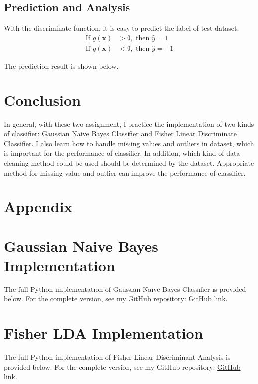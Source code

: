 \documentclass[a4paper,12pt]{article}
\begin{document}
\subsection{Prediction and Analysis}
With the discriminate function, it is easy to predict the label of test dataset.
\begin{equation}
\begin{aligned}
    \text{If } g(\mathbf{x}) &> 0, \text{ then } \hat{y} = 1\\
    \text{If } g(\mathbf{x}) &< 0, \text{ then } \hat{y} = -1
\end{aligned}
\end{equation}

The prediction result is shown below.

\section{Conclusion}
In general, with these two assignment, I practice the implementation of two kinds of classifier: Gaussian Naive Bayes Classifier and Fisher Linear Discriminate Classifier. I also learn how to handle missing values and outliers in dataset, which is important for the performance of classifier.
In addition, which kind of data cleaning method could be used should be determined by the dataset. Appropriate method for missing value and outlier can improve the performance of classifier.
\newpage



\newpage
\section{Appendix}
\appendix
\section{Gaussian Naive Bayes Implementation}
The full Python implementation of Gaussian Naive Bayes Classifier is provided below.
For the complete version, see my GitHub repository:
\href{https://github.com/yzmyyds/NTU_EE6407/blob/main/Assignments/Assignment_1/Implement.ipynb}{GitHub link}.
\section{Fisher LDA Implementation}

The full Python implementation of Fisher Linear Discriminant Analysis is provided below. 
For the complete version, see my GitHub repository: 
\href{https://github.com/yzmyyds/NTU_EE6407/blob/main/Assignments/Assignment_2/Implement.ipynb}{GitHub link}.
\end{document}
